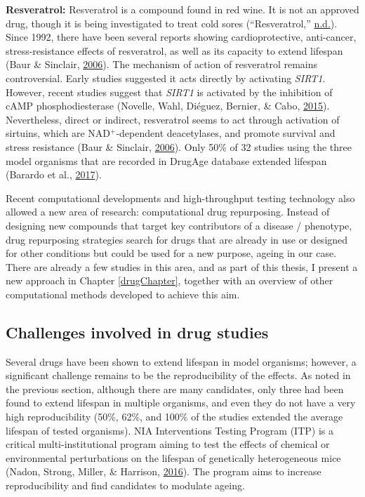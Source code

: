 \documentclass[12pt,twoside]{unicam}
\begin{document}
\textbf{Resveratrol:} Resveratrol is a compound found in red wine. It is not an approved drug, though it is being investigated to treat cold sores (``Resveratrol,'' \protect\hyperlink{ref-Resveratrol}{n.d.}). Since 1992, there have been several reports showing cardioprotective, anti-cancer, stress-resistance effects of resveratrol, as well as its capacity to extend lifespan (Baur \& Sinclair, \protect\hyperlink{ref-Baur2006}{2006}). The mechanism of action of resveratrol remains controversial. Early studies suggested it acts directly by activating \emph{SIRT1}. However, recent studies suggest that \emph{SIRT1} is activated by the inhibition of cAMP phosphodiesterase (Novelle, Wahl, Diéguez, Bernier, \& Cabo, \protect\hyperlink{ref-Novelle2015}{2015}). Nevertheless, direct or indirect, resveratrol seems to act through activation of sirtuins, which are NAD\(^+\)-dependent deacetylases, and promote survival and stress resistance (Baur \& Sinclair, \protect\hyperlink{ref-Baur2006}{2006}). Only 50\% of 32 studies using the three model organisms that are recorded in DrugAge database extended lifespan (Barardo et al., \protect\hyperlink{ref-Barardo2017}{2017}).

Recent computational developments and high-throughput testing technology also allowed a new area of research: computational drug repurposing. Instead of designing new compounds that target key contributors of a disease / phenotype, drug repurposing strategies search for drugs that are already in use or designed for other conditions but could be used for a new purpose, ageing in our case. There are already a few studies in this area, and as part of this thesis, I present a new approach in Chapter \ref{drugChapter}, together with an overview of other computational methods developed to achieve this aim.

\hypertarget{challenges-involved-in-drug-studies}{%
\subsection{Challenges involved in drug studies}\label{challenges-involved-in-drug-studies}}

Several drugs have been shown to extend lifespan in model organisms; however, a significant challenge remains to be the reproducibility of the effects. As noted in the previous section, although there are many candidates, only three had been found to extend lifespan in multiple organisms, and even they do not have a very high reproducibility (50\%, 62\%, and 100\% of the studies extended the average lifespan of tested organisms). NIA Interventions Testing Program (ITP) is a critical multi-institutional program aiming to test the effects of chemical or environmental perturbations on the lifespan of genetically heterogeneous mice (Nadon, Strong, Miller, \& Harrison, \protect\hyperlink{ref-Nadon2016}{2016}). The program aims to increase reproducibility and find candidates to modulate ageing.
\end{document}
